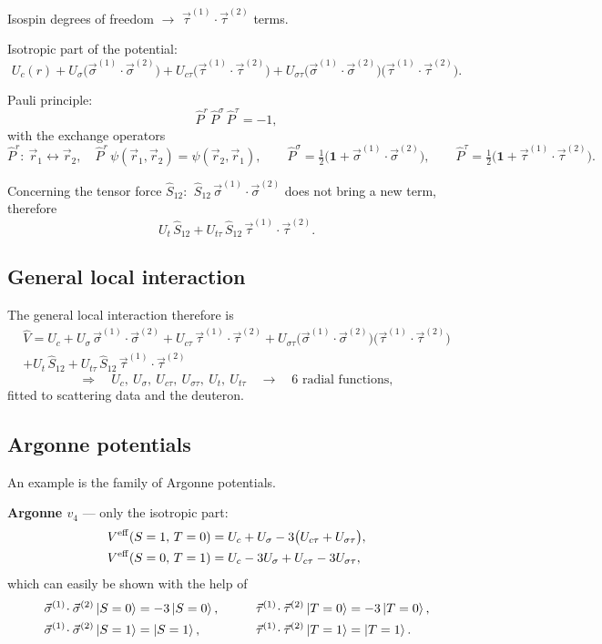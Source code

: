 \documentclass[11pt,a4paper]{article}
\newcommand{\op}[1]{\hat{#1}}
\begin{document}
Isospin degrees of freedom $\to$ $\vec\tau^{(1)}\!\cdot\vec\tau^{(2)}$ terms.

Isotropic part of the potential:
\[
U_c(r)+U_\sigma\big(\vec\sigma^{(1)}\!\cdot\vec\sigma^{(2)}\big)
+U_{c\tau}\big(\vec\tau^{(1)}\!\cdot\vec\tau^{(2)}\big)
+U_{\sigma\tau}\big(\vec\sigma^{(1)}\!\cdot\vec\sigma^{(2)}\big)\big(\vec\tau^{(1)}\!\cdot\vec\tau^{(2)}\big).
\]

Pauli principle:
\[
\op P^r\,\op P^\sigma\,\op P^\tau=-1 ,
\]
with the exchange operators
\[
\op P^r:\ \vec r_1\leftrightarrow\vec r_2,\quad
\op P^r\,\psi(\vec r_1,\vec r_2)=\psi(\vec r_2,\vec r_1),
\qquad
\op P^\sigma=\tfrac12\big(\mathbf 1+\vec\sigma^{(1)}\!\cdot\vec\sigma^{(2)}\big),
\qquad
\op P^\tau=\tfrac12\big(\mathbf 1+\vec\tau^{(1)}\!\cdot\vec\tau^{(2)}\big).
\]

Concerning the tensor force $\op S_{12}$: $\ \op S_{12}\,\vec\sigma^{(1)}\!\cdot\vec\sigma^{(2)}$
does not bring a new term, therefore
\[
U_t\,\op S_{12}+U_{t\tau}\,\op S_{12}\,\vec\tau^{(1)}\!\cdot\vec\tau^{(2)} .
\]

\subsection{General local interaction}

The general local interaction therefore is
\begin{multline*}
\op V=U_c+U_\sigma\,\vec\sigma^{(1)}\!\cdot\vec\sigma^{(2)}
+U_{c\tau}\,\vec\tau^{(1)}\!\cdot\vec\tau^{(2)}
+U_{\sigma\tau}\big(\vec\sigma^{(1)}\!\cdot\vec\sigma^{(2)}\big)\big(\vec\tau^{(1)}\!\cdot\vec\tau^{(2)}\big)\\
+U_t\,\op S_{12}+U_{t\tau}\,\op S_{12}\,\vec\tau^{(1)}\!\cdot\vec\tau^{(2)}
\end{multline*}
\[
\Rightarrow\quad U_c,\ U_\sigma,\ U_{c\tau},\ U_{\sigma\tau},\ U_t,\ U_{t\tau}
\quad\to\quad 6 \text{ radial functions},
\]
fitted to scattering data and the deuteron.

\subsection{Argonne potentials}

An example is the family of Argonne potentials.

\textbf{Argonne $v_4$} --- only the isotropic part:
\[
\begin{aligned}
V^{\rm eff}(S=1,\,T=0)&=U_c+U_\sigma-3\big(U_{c\tau}+U_{\sigma\tau}\big),\\
V^{\rm eff}(S=0,\,T=1)&=U_c-3U_\sigma+U_{c\tau}-3U_{\sigma\tau},
\end{aligned}
\]
which can easily be shown with the help of
\[
\begin{aligned}
\vec\sigma^{(1)}\!\cdot\vec\sigma^{(2)}\ket{S=0}&=-3\ket{S=0},&\qquad
\vec\tau^{(1)}\!\cdot\vec\tau^{(2)}\ket{T=0}&=-3\ket{T=0},\\
\vec\sigma^{(1)}\!\cdot\vec\sigma^{(2)}\ket{S=1}&=\ket{S=1},&\qquad
\vec\tau^{(1)}\!\cdot\vec\tau^{(2)}\ket{T=1}&=\ket{T=1}.
\end{aligned}
\]
\end{document}
